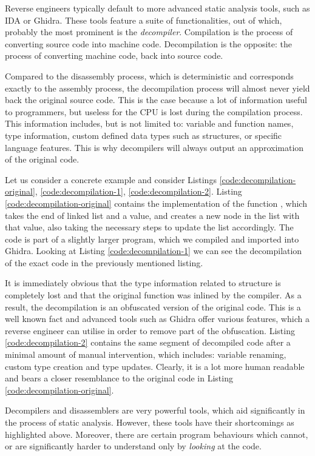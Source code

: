 Reverse engineers typically default to more advanced static analysis tools, such as IDA or Ghidra. These tools feature a suite of functionalities, out of which, probably the most prominent is the \emph{decompiler}. Compilation is the process of converting source code into machine code. Decompilation is the opposite: the process of converting machine code, back into source code. 

Compared to the disassembly process, which is deterministic and corresponds exactly to the assembly process, the decompilation process will almost never yield back the original source code. This is the case because a lot of information useful to programmers, but useless for the \gls{CPU} is lost during the compilation process. This information includes, but is not limited to: variable and function names, type information, custom defined data types such as structures, or specific language features. This is why decompilers will always output an approximation of the original code. 

Let us consider a concrete example and consider Listings \ref{code:decompilation-original}, \ref{code:decompilation-1}, \ref{code:decompilation-2}. Listing \ref{code:decompilation-original} contains the implementation of the function , which takes the end of linked list and a value, and creates a new node in the list with that value, also taking the necessary steps to update the list accordingly. The code is part of a slightly larger  program, which we compiled and imported into Ghidra. Looking at Listing \ref{code:decompilation-1} we can see the decompilation of the exact code in the previously mentioned listing. 

It is immediately obvious that the type information related to  structure is completely lost and that the original function was inlined by the compiler. As a result, the decompilation is an obfuscated version of the original code. This is a well known fact and advanced tools such as Ghidra offer various features, which a reverse engineer can utilise in order to remove part of the obfuscation. Listing \ref{code:decompilation-2} contains the same segment of decompiled code after a minimal amount of manual intervention, which includes: variable renaming, custom type creation and type updates. Clearly, it is a lot more human readable and bears a closer resemblance to the original code in Listing \ref{code:decompilation-original}. 

Decompilers and disassemblers are very powerful tools, which aid significantly in the process of static analysis. However, these tools have their shortcomings as highlighted above. Moreover, there are certain program behaviours which cannot, or are significantly harder to understand only by \emph{looking} at the code.

